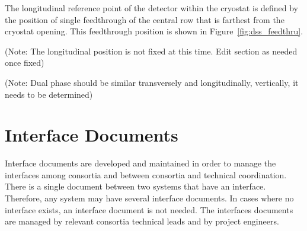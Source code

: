 The longitudinal reference point of the detector within the cryostat
is defined by the position of single feedthrough of the central row
that is farthest from the cryostat opening. This feedthrough position
is shown in Figure~\ref{fig:dss_feedthru}.


(Note: The longitudinal position is not fixed at this time. Edit
section as needed once fixed)

(Note: Dual phase should be similar
transversely and longitudinally, vertically, it needs to be
determined)


\section{Interface Documents}
\label{sec:fdsp-coord-integ-interface}

Interface documents are developed and maintained in order to manage
the interfaces among consortia and between consortia and technical
coordination. There is a single document between two systems that have
an interface. Therefore, any system may have several interface
documents. In cases where no interface exists, an interface document
is not needed. The interfaces documents are managed by relevant
consortia technical leads and by  project engineers.

